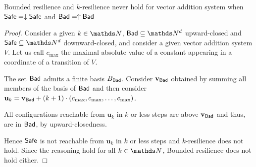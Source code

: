 \begin{proposition}
{\sc Bounded resilience} and {\sc $k$-resilience} never hold for vector addition system when $\textsf{Safe} = \downarrow \textsf{Safe}$ and $\textsf{Bad} = \uparrow \textsf{Bad}$
\end{proposition}


\begin{proof}
Consider a given $k \in \N$,
 $\Bad \subseteq \N^d$ upward-closed and $\Safe \subseteq \N^d$ downward-closed, and
consider a given vector addition system $V$.
Let us call $c_{\max}$ the maximal absolute value of a constant appearing in a coordinate of a transition of $V$.

The set $\Bad$ admits a finite basis $B_{\textsf{Bad}}$.
Consider $\textbf{v}_{\textsf{Bad}}$ obtained by summing all members of the basis of $\Bad$ and then consider 
$\textbf{u}_k = \textbf{v}_{\textsf{Bad}} + (k+1) \cdot (c_{\max}, c_{\max}, \ldots, c_{\max})$.

All configurations reachable from $\textbf{u}_k$ in $k$ or less steps are above $ \textbf{v}_{\textsf{Bad}} $
and thus, are in $\Bad$, by upward-closedness.

Hence  $\Safe$ is not reachable from $\textbf{u}_k$ in $k$ or less steps  and {$k$-resilience} does not hold.
Since the reasoning hold for all $k \in \N$, {\sc Bounded-resilience} does not hold either.
\end{proof}

\iffalse
\mathieu{
resilience never hold in the case of VAS. 
What happens when you add states ? \\
So you consider for instance $q_0(u_k)$ instead of just $u_k$. \\
Everything reachable from $q_0(u_k)$ is still of the form $q(u)$ with u greater than $v_{\Bad}$
(we'd have $v_{\Bad}$ sum of the coordinate of the elements from the basis of $\Bad$ when not considering states).
So now, let us fix some state $q$.
Either there is an element of the basis of $\Bad$ with state $q$.
Then $q(u)$ is necessarily in $\Bad$ (If this hold for all $q \in Q$, then again $k$-resilience does not hold).
Either there is none.
If there is none, then $q(\omega)$ is in the complement of $\Bad$, i.e. $\Safe$.
Then, of course there are probably other elements in $\Safe$ but from
the perspective of $\Bad$ and the extremely high elements $q_i(u_k)$  these ‘smaller’ elements are all but unreachable. 
And the question becomes rather `can we reach $q(\omega)$ from every element of $\Bad$ save from maybe the few smaller ones ?’
Since $q(\omega)$ here is upward-closed this is decidable i.e. it is asking coverability questions. 
It’s not 100\% the question «asking, for every element in the basis of $\Bad$, whether or not $q(0)$ is coverable from it», since you could have, for smaller elements in $\Bad$, other elements of $\Safe$ you can reach, but it seem close.
This would lead to a decision scheme.
Need to write this more formally/properly.}
\fi

